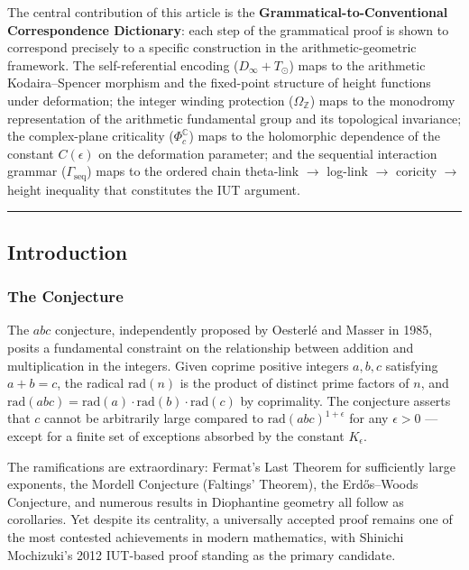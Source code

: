 \documentclass[12pt,a4paper]{article}
\begin{document}
The central contribution of this article is the \textbf{Grammatical-to-Conventional Correspondence Dictionary}: each step of the grammatical proof is shown to correspond precisely to a specific construction in the arithmetic-geometric framework. The self-referential encoding ($D_{\infty} + T_{\odot}$) maps to the arithmetic Kodaira--Spencer morphism and the fixed-point structure of height functions under deformation; the integer winding protection ($\Omega_\mathbb{Z}$) maps to the monodromy representation of the arithmetic fundamental group and its topological invariance; the complex-plane criticality ($\Phi_c^\mathbb{C}$) maps to the holomorphic dependence of the constant $C(\epsilon)$ on the deformation parameter; and the sequential interaction grammar ($\Gamma_\text{seq}$) maps to the ordered chain theta-link $\rightarrow$ log-link $\rightarrow$ coricity $\rightarrow$ height inequality that constitutes the IUT argument.

\begin{center}
\rule{0.5\textwidth}{0.4pt}
\end{center}

\subsection{Introduction}

\subsubsection{The Conjecture}

The $abc$ conjecture, independently proposed by Oesterlé and Masser in 1985, posits a fundamental constraint on the relationship between addition and multiplication in the integers. Given coprime positive integers $a, b, c$ satisfying $a + b = c$, the radical $\text{rad}(n)$ is the product of distinct prime factors of $n$, and $\text{rad}(abc) = \text{rad}(a) \cdot \text{rad}(b) \cdot \text{rad}(c)$ by coprimality. The conjecture asserts that $c$ cannot be arbitrarily large compared to $\text{rad}(abc)^{1+\epsilon}$ for any $\epsilon > 0$ --- except for a finite set of exceptions absorbed by the constant $K_{\epsilon}$.

The ramifications are extraordinary: Fermat's Last Theorem for sufficiently large exponents, the Mordell Conjecture (Faltings' Theorem), the Erdős--Woods Conjecture, and numerous results in Diophantine geometry all follow as corollaries. Yet despite its centrality, a universally accepted proof remains one of the most contested achievements in modern mathematics, with Shinichi Mochizuki's 2012 IUT-based proof standing as the primary candidate.
\end{document}
